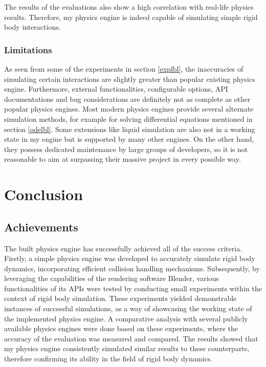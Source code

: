 \documentclass[12pt,a4paper,twoside,openright]{report}
\begin{document}
\begin{itemize}
The results of the evaluations also show a high correlation with real-life physics results. Therefore, my physics engine is indeed capable of simulating simple rigid body interactions.

\subsection{Limitations}

As seen from some of the experiments in section \ref{explbl}, the inaccuracies of simulating certain interactions are slightly greater than popular existing physics engine. Furthermore, external functionalities, configurable options, API documentations and bug considerations are definitely not as complete as other popular physics engines. Most modern physics engines provide several alternate simulation methods, for example for solving differential equations mentioned in section \ref{odelbl}. Some extensions like liquid simulation are also not in a working state in my engine but is supported by many other engines. On the other hand, they possess dedicated maintenance by large groups of developers, so it is not reasonable to aim at surpassing their massive project in every possible way.

\end{itemize}

\chapter{Conclusion}\label{chap5}

\section{Achievements}

The built physics engine has successfully achieved all of the success criteria. Firstly, a simple physics engine was developed to accurately simulate rigid body dynamics, incorporating efficient collision handling mechanisms. Subsequently, by leveraging the capabilities of the rendering software Blender, various functionalities of its APIs were tested by conducting small experiments within the context of rigid body simulation. These experiments yielded demonstrable instances of successful simulations, as a way of showcasing the working state of the implemented physics engine. A comparative analysis with several publicly available physics engines were done based on these experiments, where the accuracy of the evaluation was measured and compared. The results showed that my physics engine consistently simulated similar results to these counterparts, therefore confirming its ability in the field of rigid body dynamics.
\end{document}
